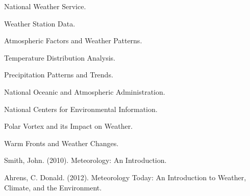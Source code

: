 \documentclass{article}
\begin{document}
\begin{thebibliography}{10}

National Weather Service.

Weather Station Data.

Atmospheric Factors and Weather Patterns.

Temperature Distribution Analysis.

Precipitation Patterns and Trends.

National Oceanic and Atmospheric Administration.

National Centers for Environmental Information.

Polar Vortex and its Impact on Weather.

Warm Fronts and Weather Changes.

Smith, John. (2010).
\newblock Meteorology: An Introduction.

Ahrens, C. Donald. (2012).
\newblock Meteorology Today: An Introduction to Weather, Climate, and the Environment.

\end{thebibliography}
\end{document}
